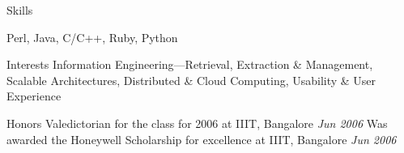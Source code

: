 \documentclass{resume}
\renewcommand{\labelcitem}{}
\newcommand{\period}{\hfill\small\sl}
\begin{document}
\begin{category}{Skills}

     Perl, Java, C/C++, Ruby, Python


\end{category}


\begin{category}{Interests}
    \citemnobullet Information Engineering---Retrieval, Extraction \& Management, Scalable Architectures, Distributed \& Cloud Computing, Usability \& User Experience
\end{category}


\renewcommand{\labelcitem}{$\diamond$}


\begin{category}{Honors}
    \citembullet Valedictorian for the class for 2006 at IIIT, Bangalore {\period Jun 2006}
    \citembullet Was awarded the Honeywell Scholarship for excellence at IIIT, Bangalore {\period Jun 2006}
\end{category}
\end{document}
